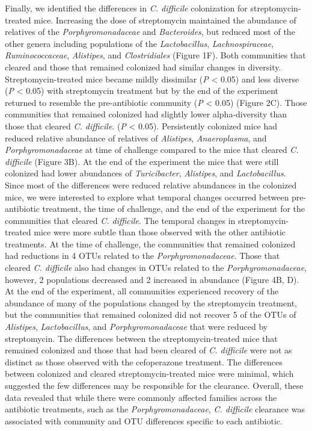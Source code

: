 \documentclass[12pt,]{article}
\begin{document}
Finally, we identified the differences in \emph{C. difficile}
colonization for streptomycin-treated mice. Increasing the dose of
streptomycin maintained the abundance of relatives of the
\emph{Porphyromonadaceae} and \emph{Bacteroides}, but reduced most of
the other genera including populations of the \emph{Lactobacillus},
\emph{Lachnospiraceae}, \emph{Ruminococcaceae}, \emph{Alistipes}, and
\emph{Clostridiales} (Figure 1F). Both communities that cleared and
those that remained colonized had similar changes in diversity.
Streptomycin-treated mice became mildly dissimilar (\emph{P} \textless{}
0.05) and less diverse (\emph{P} \textless{} 0.05) with streptomycin
treatment but by the end of the experiment returned to resemble the
pre-antibiotic community (\emph{P} \textless{} 0.05) (Figure 2C). Those
communities that remained colonized had slightly lower alpha-diversity
than those that cleared \emph{C. difficile}. (\emph{P} \textless{}
0.05). Persistently colonized mice had reduced relative abundance of
relatives of \emph{Alistipes}, \emph{Anaeroplasma}, and
\emph{Porphyromonadaceae} at time of challenge compared to the mice that
cleared \emph{C. difficile} (Figure 3B). At the end of the experiment
the mice that were still colonized had lower abundances of
\emph{Turicibacter}, \emph{Alistipes}, and \emph{Lactobacillus}. Since
most of the differences were reduced relative abundances in the
colonized mice, we were interested to explore what temporal changes
occurred between pre-antibiotic treatment, the time of challenge, and
the end of the experiment for the communities that cleared \emph{C.
difficile}. The temporal changes in streptomycin-treated mice were more
subtle than those observed with the other antibiotic treatments. At the
time of challenge, the communities that remained colonized had
reductions in 4 OTUs related to the \emph{Porphyromonadaceae}. Those
that cleared \emph{C. difficile} also had changes in OTUs related to the
\emph{Porphyromonadaceae}, however, 2 populations decreased and 2
increased in abundance (Figure 4B, D). At the end of the experiment, all
communities experienced recovery of the abundance of many of the
populations changed by the streptomycin treatment, but the communities
that remained colonized did not recover 5 of the OTUs of
\emph{Alistipes}, \emph{Lactobacillus}, and \emph{Porphyromonadaceae}
that were reduced by streptomycin. The differences between the
streptomycin-treated mice that remained colonized and those that had
been cleared of \emph{C. difficile} were not as distinct as those
observed with the cefoperazone treatment. The differences between
colonized and cleared streptomycin-treated mice were minimal, which
suggested the few differences may be responsible for the clearance.
Overall, these data revealed that while there were commonly affected
families across the antibiotic treatments, such as the
\emph{Porphyromonadaceae}, \emph{C. difficile} clearance was associated
with community and OTU differences specific to each antibiotic.
\end{document}
